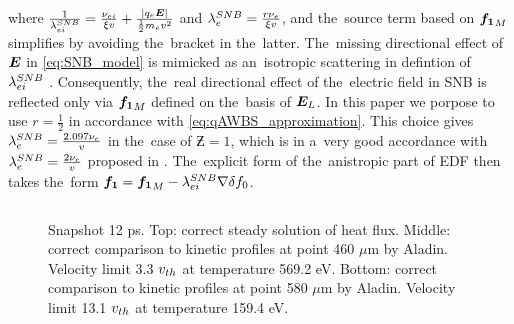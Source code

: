 where $\frac{1}{\lambda_{ei}^{SNB}} = 
\frac{\nu_{ei}}{\xi v} + \frac{|q_e\boldsymbol{E}|}{\frac{1}{2}m_ev^2}$ 
and $\lambda_e^{SNB} = \frac{r \nu_{e}}{\xi v}$, and the~source term based on 
${\boldsymbol{f_1}}_M$ simplifies by avoiding the~bracket in the~latter. The~missing
directional effect of $\boldsymbol{E}$ in \eqref{eq:SNB_model} is mimicked as 
an~isotropic scattering in defintion of $\lambda_{ei}^{SNB}$ \cite{Schurtz_2000}.
Consequently, the~real directional effect of the~electric field in SNB
is reflected only via ${\boldsymbol{f_1}}_M$ defined on the~basis of $\boldsymbol{E}_L$.
In this paper we porpose to use $r = \frac{1}{2}$ in accordance with 
\eqref{eq:qAWBS_approximation}. This choice gives 
$\lambda_e^{SNB} = \frac{2.097\nu_{e}}{v}$ in the~case of $\Zbar = 1$, 
which is in a~very good accordance with $\lambda_e^{SNB} = \frac{2\nu_{e}}{v}$ 
proposed in \cite{Brodrick_PoP2017}. The~explicit form of the~anistropic part of EDF then takes the~form ${\boldsymbol{f_1}} = {\boldsymbol{f_1}}_M - \lambda_{ei}^{SNB}\nabla\delta f_0$.

\begin{figure}[tbh]
  \begin{center}
    \begin{tabular}{c}
    \end{tabular}
  \caption{  
  Snapshot 12 ps. Top: correct steady solution of heat flux.  
  Middle: correct comparison to kinetic profiles at point 460 $\mu$m by Aladin. 
  Velocity limit 3.3 $v_{th}$ at temperature 569.2 eV.
  Bottom: correct comparison to kinetic profiles at point 580 $\mu$m by Aladin.
  Velocity limit 13.1 $v_{th}$ at temperature 159.4 eV.
  }
  \label{fig:C7_Aladin_case3}
  \end{center} 
\end{figure}


